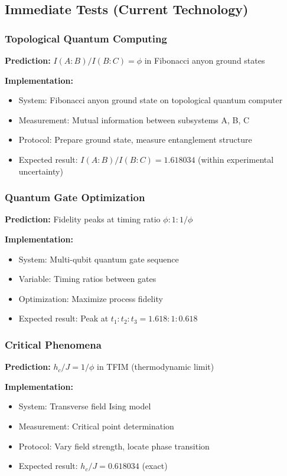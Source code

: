 \documentclass[11pt]{article}
\theoremstyle{definition}
\newcommand{\goldenratio}{\phi}
\begin{document}
\subsection{Immediate Tests (Current Technology)}

\subsubsection{Topological Quantum Computing}

\textbf{Prediction:} $I(A:B)/I(B:C) = \goldenratio$ in Fibonacci anyon ground states

\textbf{Implementation:}
\begin{itemize}
\item System: Fibonacci anyon ground state on topological quantum computer
\item Measurement: Mutual information between subsystems A, B, C
\item Protocol: Prepare ground state, measure entanglement structure
\item Expected result: $I(A:B)/I(B:C) = 1.618034$ (within experimental uncertainty)
\end{itemize}

\subsubsection{Quantum Gate Optimization}

\textbf{Prediction:} Fidelity peaks at timing ratio $\goldenratio:1:1/\goldenratio$

\textbf{Implementation:}
\begin{itemize}
\item System: Multi-qubit quantum gate sequence
\item Variable: Timing ratios between gates
\item Optimization: Maximize process fidelity
\item Expected result: Peak at $t_1:t_2:t_3 = 1.618:1:0.618$
\end{itemize}

\subsubsection{Critical Phenomena}

\textbf{Prediction:} $h_c/J = 1/\goldenratio$ in TFIM (thermodynamic limit)

\textbf{Implementation:}
\begin{itemize}
\item System: Transverse field Ising model
\item Measurement: Critical point determination
\item Protocol: Vary field strength, locate phase transition
\item Expected result: $h_c/J = 0.618034$ (exact)
\end{itemize}
\end{document}
